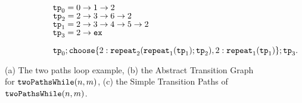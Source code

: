 {\begin{figure}
\begin{subfigure}{.71\textwidth}
\begin{subfigure}{.67\textwidth}
\begin{centering}
\begin{tikzpicture}[scale=\textwidth/20cm,samples=200]
  \end{tikzpicture}
        \caption{}
\end{centering}
\end{subfigure}
{\small
\begin{subfigure}{.3\textwidth}
\begin{centering}
        $\tpath_0 = 0 \to 1 \to 2$ \\
        $\tpath_2 = 2 \to 3 \to 6 \to 2$ \\ 
        $\tpath_1 = 2 \to 3 \to 4 \to 5 \to 2$ \\
        $\tpath_3 = 2 \to \lex$
        \caption{}
\end{centering}
\end{subfigure}
}
{\small
\begin{subfigure}{.8\textwidth}
\begin{centering}
    $
    \tpath_0 ; 
    \rpchoose{2: \rprepeat_2(\rprepeat_1(\tpath_1); \tpath_2), 
    2: \rprepeat_1(\tpath_1)}; \tpath_3.
    $
\end{centering}
\end{subfigure}
}
\end{subfigure}
\vspace{-0.2cm}
\caption{
    (a) The two paths loop example,
    (b) the Abstract Transition Graph for $\kw{twoPathsWhile}(n, m)$,
    (c) the Simple Transition Paths of $\kw{twoPathsWhile}(n, m)$.}
    \vspace{-0.5cm}
        \label{fig:whileTwoCounters-overview}
    \end{figure}
    }


